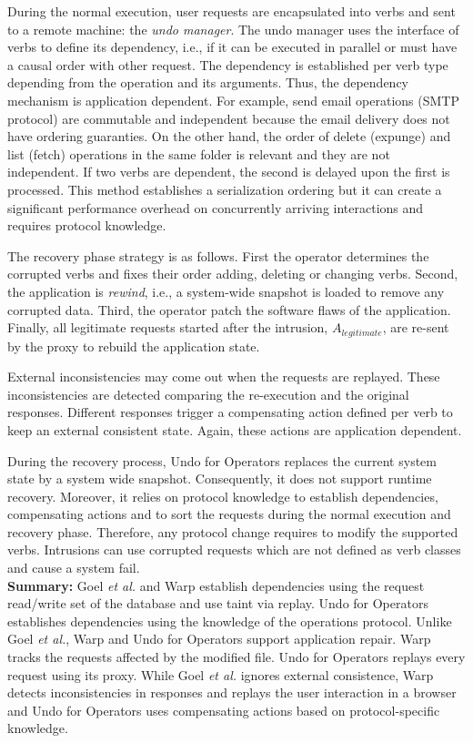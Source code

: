 During the normal execution, user requests are encapsulated into verbs and sent to a remote machine: the \emph{undo manager}. The undo manager uses the interface of verbs to define its dependency, i.e., if it can be executed in parallel or must have a causal order with other request. The dependency is established per verb type depending from the operation and its arguments. Thus, the dependency mechanism is application dependent. For example, send email operations (SMTP protocol) are commutable and independent because the email delivery does not have ordering guaranties. On the other hand, the order of delete (expunge) and list (fetch) operations in the same folder is relevant and they are not independent. If two verbs are dependent, the second is delayed upon the first is processed. This method establishes a serialization ordering but it can create a significant performance overhead on concurrently arriving interactions and requires protocol knowledge.

The recovery phase strategy is as follows. First the operator determines the corrupted verbs and fixes their order adding, deleting or changing verbs. Second, the application is \textit{rewind}, i.e., a system-wide snapshot is loaded to remove any corrupted data. Third, the operator patch the software flaws of the application. Finally, all legitimate requests started after the intrusion, $A_{legitimate}$, are re-sent by the proxy to rebuild the application state. 

External inconsistencies may come out when the requests are replayed. These inconsistencies are detected comparing the re-execution and the original responses. Different responses trigger a compensating action defined per verb to keep an external consistent state. Again, these actions are application dependent.

During the recovery process, Undo for Operators replaces the current system state by a system wide snapshot. Consequently, it does not support runtime recovery. Moreover, it relies on protocol knowledge to establish dependencies, compensating actions and to sort the requests during the normal execution and recovery phase. Therefore, any protocol change requires to modify the supported verbs. Intrusions can use corrupted requests which are not defined as verb classes and cause a system fail.\\


\textbf{Summary:} Goel \textit{et al.} and Warp \cite{warp} establish dependencies using the request read/write set of the database and use taint via replay. Undo for Operators \cite{undoForOperators} establishes dependencies using the knowledge of the operations protocol. Unlike Goel \textit{et al.}, Warp \cite{warp} and Undo for Operators \cite{undoForOperators} support application repair. Warp tracks the requests affected by the modified file. Undo for Operators replays every request using its proxy. While Goel \textit{et al.} ignores external consistence, Warp \cite{warp} detects inconsistencies in responses and replays the user interaction in a browser and Undo for Operators uses compensating actions based on protocol-specific knowledge.

